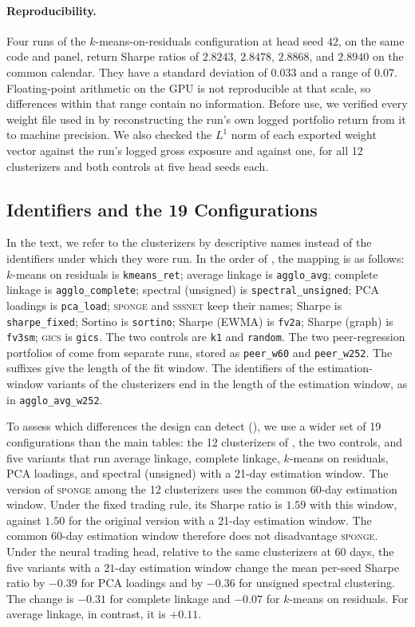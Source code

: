 \paragraph{Reproducibility.} Four runs of the $k$-means-on-residuals configuration at head seed $42$, on the same code and panel, return Sharpe ratios of $2.8243$, $2.8478$, $2.8868$, and $2.8940$ on the common calendar. They have a standard deviation of $0.033$ and a range of $0.07$. Floating-point
arithmetic on the GPU is not reproducible at that scale, so
differences within that range contain no information. Before use, we verified every weight file used in  by reconstructing the run's own logged portfolio return from it to machine precision. We also checked the $L^1$ norm of each exported weight vector against the run's logged gross exposure and against one, for all 12 clusterizers and both controls at five head seeds each.

\subsection{Identifiers and the 19 Configurations}
\label{app:names}

In the text, we refer to the clusterizers by descriptive names instead of the identifiers under which they were run. In the order of
, the mapping is as follows: $k$-means on residuals is \texttt{kmeans\_ret};
average linkage is \texttt{agglo\_avg}; complete linkage is \texttt{agglo\_complete}; spectral (unsigned) is
\texttt{spectral\_unsigned}; PCA loadings is \texttt{pca\_load};
\textsc{sponge} and \textsc{sssnet} keep their names; Sharpe is \texttt{sharpe\_fixed}; Sortino is \texttt{sortino}; Sharpe (EWMA) is \texttt{fv2a}; Sharpe (graph) is \texttt{fv3sm}; \textsc{gics} is
\texttt{gics}. The two controls are \texttt{k1} and \texttt{random}. The two peer-regression portfolios of  come from separate runs, stored as \texttt{peer\_w60} and \texttt{peer\_w252}. The suffixes give the length of the fit window. The identifiers of the estimation-window variants of the clusterizers end in the length of the estimation window, as in \texttt{agglo\_avg\_w252}.

To assess which differences the design can detect (), we use a
wider set of 19 configurations than the main tables: the 12 clusterizers of , the two controls, and five variants that run average linkage, complete linkage, $k$-means on residuals, PCA loadings, and spectral (unsigned) with a 21-day estimation window. The version of \textsc{sponge} among the 12 clusterizers uses the common 60-day estimation window. Under the fixed trading rule, its Sharpe ratio is $1.59$ with this window, against $1.50$ for the original version with a 21-day estimation window. The common 60-day estimation window therefore does not disadvantage \textsc{sponge}. Under the neural trading head, relative to the same clusterizers at $60$ days, the five variants with a $21$-day estimation window change the mean per-seed Sharpe ratio by $-0.39$ for PCA loadings and by $-0.36$ for unsigned spectral clustering. The change is $-0.31$ for complete linkage and $-0.07$ for $k$-means on residuals. For average linkage, in contrast, it is $+0.11$.

